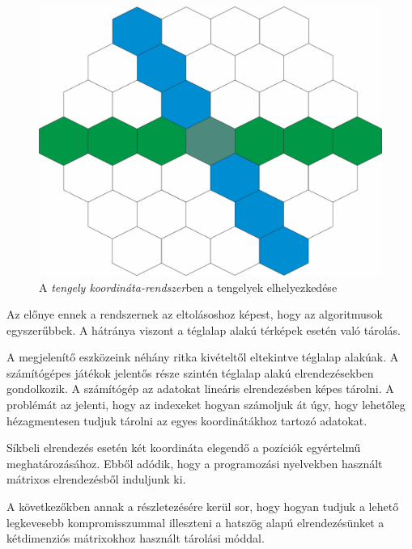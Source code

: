 \begin{figure}[h!]
\centering
\includegraphics[scale=0.3]{kepek/AxialCoord.jpg}
\caption{A \textit{tengely koordináta-rendszer}ben a tengelyek elhelyezkedése}
\label{fig:AxialCoord}
\end{figure}

Az előnye ennek a rendszernek az eltolásoshoz képest, hogy az algoritmusok egyszerűbbek. A hátránya viszont a téglalap alakú térképek esetén való tárolás. 

\newpage
{}

A megjelenítő eszközeink néhány ritka kivételtől eltekintve téglalap alakúak. A számítógépes játékok jelentős része szintén téglalap alakú elrendezésekben gondolkozik. A számítógép az adatokat lineáris elrendezésben képes tárolni. A problémát az jelenti, hogy az indexeket hogyan számoljuk át úgy, hogy lehetőleg hézagmentesen tudjuk tárolni az egyes koordinátákhoz tartozó adatokat.

Síkbeli elrendezés esetén két koordináta elegendő a pozíciók egyértelmű meghatározásához. Ebből adódik, hogy a programozási nyelvekben használt mátrixos elrendezésből induljunk ki.

A következőkben annak a részletezésére kerül sor, hogy hogyan tudjuk a lehető legkevesebb kompromisszummal illeszteni a hatszög alapú elrendezésünket a kétdimenziós mátrixokhoz használt tárolási móddal.

